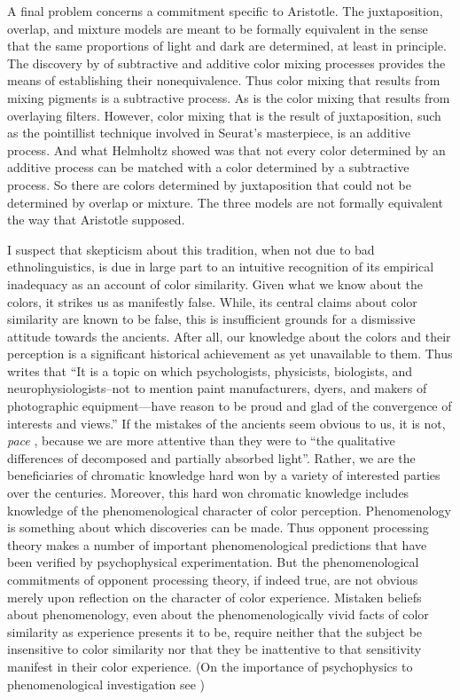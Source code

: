 A final problem concerns a commitment specific to Aristotle. The juxtaposition, overlap, and mixture models are meant to be formally equivalent in the sense that the same proportions of light and dark are determined, at least in principle. The discovery by \citet{Helmholtz:1852aa} of subtractive and additive color mixing processes provides the means of establishing their nonequivalence. Thus color mixing that results from mixing pigments is a subtractive process. As is the color mixing that results from overlaying filters. However, color mixing that is the result of juxtaposition, such as the pointillist technique involved in Seurat's masterpiece, is an additive process. And what Helmholtz showed was that not every color determined by an additive process can be matched with a color determined by a subtractive process. So there are colors determined by juxtaposition that could not be determined by overlap or mixture. The three models are not formally equivalent the way that Aristotle supposed.

I suspect that skepticism about this tradition, when not due to bad ethnolinguistics, is due in large part to an intuitive recognition of its empirical inadequacy as an account of color similarity. Given what we know about the colors, it strikes us as manifestly false. While, its central claims about color similarity are known to be false, this is insufficient grounds for a dismissive attitude towards the ancients. After all, our knowledge about the colors and their perception is a significant historical achievement as yet unavailable to them. Thus \citet[291]{Broackes:2010uq} writes that ``It is a topic on which psychologists, physicists, biologists, and neurophysiologists--not to mention paint manufacturers, dyers, and makers of photographic equipment---have reason to be proud and glad of the convergence of interests and views.'' If the mistakes of the ancients seem obvious to us, it is not, \emph{pace} \citet[162]{Platnauer:1921bh}, because we are more attentive than they were to ``the qualitative differences of decomposed and partially absorbed light''. Rather, we are the beneficiaries of chromatic knowledge hard won by a variety of interested parties over the centuries. Moreover, this hard won chromatic knowledge includes knowledge of the phenomenological character of color perception. Phenomenology is something about which discoveries can be made. Thus opponent processing theory makes a number of important phenomenological predictions that have been verified by psychophysical experimentation. But the phenomenological commitments of opponent processing theory, if indeed true, are not obvious merely upon reflection on the character of color experience. Mistaken beliefs about phenomenology, even about the phenomenologically vivid facts of color similarity as experience presents it to be, require neither that the subject be insensitive to color similarity nor that they be inattentive to that sensitivity manifest in their color experience. (On the importance of psychophysics to phenomenological investigation see \citealt{Hilbert:2007qy,Phillips:2012af})

